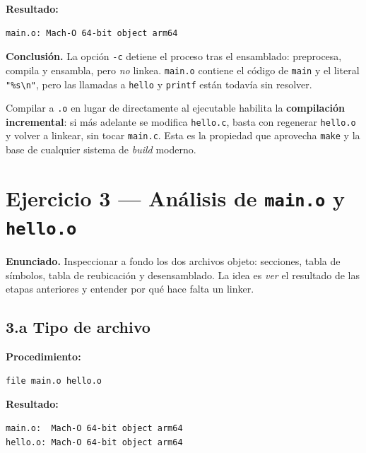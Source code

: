 \documentclass[11pt,a4paper]{article}
\begin{document}
\textbf{Resultado:}

\begin{lstlisting}[style=outstyle]
main.o: Mach-O 64-bit object arm64
\end{lstlisting}

\textbf{Conclusión.} La opción \texttt{-c} detiene el proceso tras el
ensamblado: preprocesa, compila y ensambla, pero \emph{no} linkea.
\texttt{main.o} contiene el código de \texttt{main} y el literal
\texttt{"\%s\textbackslash n"}, pero las llamadas a \texttt{hello} y
\texttt{printf} están todavía sin resolver.

\begin{idea}
Compilar a \texttt{.o} en lugar de directamente al ejecutable habilita
la \textbf{compilación incremental}: si más adelante se modifica
\texttt{hello.c}, basta con regenerar \texttt{hello.o} y volver a
linkear, sin tocar \texttt{main.c}. Esta es la propiedad que aprovecha
\texttt{make} y la base de cualquier sistema de \emph{build}
moderno.
\end{idea}

\section{Ejercicio 3 --- Análisis de \texttt{main.o} y \texttt{hello.o}}

\textbf{Enunciado.} Inspeccionar a fondo los dos archivos objeto:
secciones, tabla de símbolos, tabla de reubicación y desensamblado.
La idea es \emph{ver} el resultado de las etapas anteriores y entender
por qué hace falta un linker.

\subsection*{3.a Tipo de archivo}

\textbf{Procedimiento:}

\begin{lstlisting}
file main.o hello.o
\end{lstlisting}

\textbf{Resultado:}

\begin{lstlisting}[style=outstyle]
main.o:  Mach-O 64-bit object arm64
hello.o: Mach-O 64-bit object arm64
\end{lstlisting}
\end{document}
